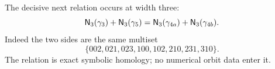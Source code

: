 The decisive next relation occurs at width three:
\begin{equation}\label{eq:triple-relation}
 \mathsf N_3(\gamma_3)+\mathsf N_3(\gamma_5)
 =\mathsf N_3(\gamma_{4a})+\mathsf N_3(\gamma_{4b}).
\end{equation}
Indeed the two sides are the same multiset
\[
 \{002,021,023,100,102,210,231,310\}.
\]
The relation is exact symbolic homology; no numerical orbit data enter it.
